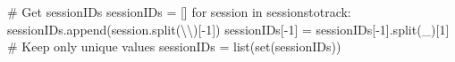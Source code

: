 \documentclass[
  letterpaper,
  DIV=11,
  numbers=noendperiod]{scrreprt}
\newenvironment{Shaded}{\begin{snugshade}}{\end{snugshade}}
\newcommand{\BuiltInTok}[1]{\textcolor[rgb]{0.00,0.23,0.31}{#1}}
\newcommand{\CharTok}[1]{\textcolor[rgb]{0.13,0.47,0.30}{#1}}
\newcommand{\CommentTok}[1]{\textcolor[rgb]{0.37,0.37,0.37}{#1}}
\newcommand{\ControlFlowTok}[1]{\textcolor[rgb]{0.00,0.23,0.31}{#1}}
\newcommand{\DecValTok}[1]{\textcolor[rgb]{0.68,0.00,0.00}{#1}}
\newcommand{\KeywordTok}[1]{\textcolor[rgb]{0.00,0.23,0.31}{#1}}
\newcommand{\NormalTok}[1]{\textcolor[rgb]{0.00,0.23,0.31}{#1}}
\newcommand{\OperatorTok}[1]{\textcolor[rgb]{0.37,0.37,0.37}{#1}}
\newcommand{\StringTok}[1]{\textcolor[rgb]{0.13,0.47,0.30}{#1}}
\begin{document}
\begin{Shaded}
\begin{Highlighting}[]
\CommentTok{\# Get sessionIDs}
\NormalTok{sessionIDs }\OperatorTok{=}\NormalTok{ []}
\ControlFlowTok{for}\NormalTok{ session }\KeywordTok{in}\NormalTok{ sessionstotrack:}
\NormalTok{    sessionIDs.append(session.split(}\StringTok{\textquotesingle{}}\CharTok{\textbackslash{}\textbackslash{}}\StringTok{\textquotesingle{}}\NormalTok{)[}\OperatorTok{{-}}\DecValTok{1}\NormalTok{])}
\NormalTok{    sessionIDs[}\OperatorTok{{-}}\DecValTok{1}\NormalTok{] }\OperatorTok{=}\NormalTok{ sessionIDs[}\OperatorTok{{-}}\DecValTok{1}\NormalTok{].split(}\StringTok{\textquotesingle{}\_\textquotesingle{}}\NormalTok{)[}\DecValTok{1}\NormalTok{]}
    \CommentTok{\# Keep only unique values}
\NormalTok{    sessionIDs }\OperatorTok{=} \BuiltInTok{list}\NormalTok{(}\BuiltInTok{set}\NormalTok{(sessionIDs))}
\end{Highlighting}
\end{Shaded}
\end{document}
